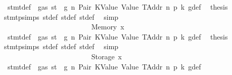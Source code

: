 \begin{isabellebody}
\ {}{\isacharparenleft}{\kern0pt}{}{\isacharparenright}{\kern0pt}\ stmt{\isacharunderscore}{\kern0pt}def\ {\isacharbackquoteopen}{\isasymnot}\ gas\ st\ {\isasymle}\ g{\isacharbackquoteclose}\ n\ Pair\ KValue\ Value\ TAddr\ n{}\ p{}\ k{}\ g{\isacharunderscore}{\kern0pt}def\ \isamarkupfalse%
\ {\isacharquery}{\kern0pt}thesis\ \isamarkupfalse%
\ stmt{\isachardot}{\kern0pt}psimps{\isacharparenleft}{\kern0pt}{}{\isacharparenright}{\kern0pt}\ st{\isacharprime}{\kern0pt}{\isacharunderscore}{\kern0pt}def\ st{\isacharprime}{\kern0pt}{\isacharprime}{\kern0pt}{\isacharunderscore}{\kern0pt}def\ st{\isacharprime}{\kern0pt}{\isacharprime}{\kern0pt}{\isacharprime}{\kern0pt}{\isacharunderscore}{\kern0pt}def\ \isamarkupfalse%
\ simp\isanewline
\ \ \ \ \ \ \ \ \ \ \ \ \ \ \ \ \ \ \ \ \ \ \isamarkupfalse%
\isanewline
\ \ \ \ \ \ \ \ \ \ \ \ \ \ \ \ \ \ \ \ \ \ \ \ \isamarkupfalse%
\ {\isacharparenleft}{\kern0pt}Memory\ x{}{\isacharparenright}{\kern0pt}\isanewline
\ \ \ \ \ \ \ \ \ \ \ \ \ \ \ \ \ \ \ \ \ \ \ \ \isamarkupfalse%
\ {}{\isacharparenleft}{\kern0pt}{}{\isacharparenright}{\kern0pt}\ stmt{\isacharunderscore}{\kern0pt}def\ {\isacharbackquoteopen}{\isasymnot}\ gas\ st\ {\isasymle}\ g{\isacharbackquoteclose}\ n\ Pair\ KValue\ Value\ TAddr\ n{}\ p{}\ k{}\ g{\isacharunderscore}{\kern0pt}def\ \isamarkupfalse%
\ {\isacharquery}{\kern0pt}thesis\ \isamarkupfalse%
\ stmt{\isachardot}{\kern0pt}psimps{\isacharparenleft}{\kern0pt}{}{\isacharparenright}{\kern0pt}\ st{\isacharprime}{\kern0pt}{\isacharunderscore}{\kern0pt}def\ st{\isacharprime}{\kern0pt}{\isacharprime}{\kern0pt}{\isacharunderscore}{\kern0pt}def\ st{\isacharprime}{\kern0pt}{\isacharprime}{\kern0pt}{\isacharprime}{\kern0pt}{\isacharunderscore}{\kern0pt}def\ \isamarkupfalse%
\ simp\isanewline
\ \ \ \ \ \ \ \ \ \ \ \ \ \ \ \ \ \ \ \ \ \ \isamarkupfalse%
\isanewline
\ \ \ \ \ \ \ \ \ \ \ \ \ \ \ \ \ \ \ \ \ \ \ \ \isamarkupfalse%
\ {\isacharparenleft}{\kern0pt}Storage\ x{}{\isacharparenright}{\kern0pt}\isanewline
\ \ \ \ \ \ \ \ \ \ \ \ \ \ \ \ \ \ \ \ \ \ \ \ \isamarkupfalse%
\ {}{\isacharparenleft}{\kern0pt}{}{\isacharparenright}{\kern0pt}\ stmt{\isacharunderscore}{\kern0pt}def\ {\isacharbackquoteopen}{\isasymnot}\ gas\ st\ {\isasymle}\ g{\isacharbackquoteclose}\ n\ Pair\ KValue\ Value\ TAddr\ n{}\ p{}\ k{}\ g{\isacharunderscore}{\kern0pt}def\ \isamarkupfalse%

\end{isabellebody}
